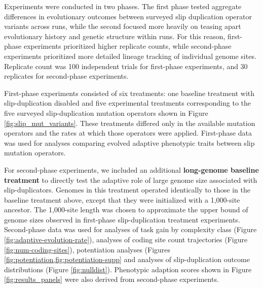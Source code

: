 Experiments were conducted in two phases.
The first phase tested aggregate differences in evolutionary outcomes between surveyed slip duplication operator variants across runs, while the second focused more heavily on teasing apart evolutionary history and genetic structure within runs.
For this reason, first-phase experiments prioritized higher replicate counts, while second-phase experiments prioritized more detailed lineage tracking of individual genome sites.
Replicate count was 100 independent trials for first-phase experiments, and 30 replicates for second-phase experiments.

First-phase experiments consisted of six treatments: one baseline treatment with slip-duplication disabled and five experimental treatments corresponding to the five surveyed slip-duplication mutation operators shown in Figure \ref{fig:slip_mut_variants}.
These treatments differed only in the available mutation operators and the rates at which those operators were applied.
First-phase data was used for analyses comparing evolved adaptive phenotypic traits between slip mutation operators.


For second-phase experiments, we included an additional \textbf{long-genome baseline treatment} to directly test the adaptive role of large genome size associated with slip-duplicators.
Genomes in this treatment operated identically to those in the baseline treatment above, except that they were initialized with a 1,000-site ancestor.
The 1,000-site length was chosen to approximate the upper bound of genome sizes observed in first-phase slip-duplication treatment experiments.
Second-phase data was used for analyses of task gain by complexity class (Figure \ref{fig:adaptive-evolution-rate}), analyses of coding site count trajectories (Figure \ref{fig:num-coding-sites}), potentiation analyses (Figures \cref{fig:potentiation,fig:potentiation-supp} and analyses of slip-duplication outcome distributions (Figure \ref{fig:nulldist}).
Phenotypic adaption scores shown in Figure \ref{fig:results_panels} were also derived from second-phase experiments.

